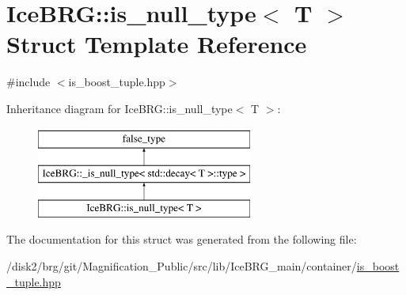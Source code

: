 \hypertarget{structIceBRG_1_1is__null__type}{}\section{Ice\+B\+R\+G\+:\+:is\+\_\+null\+\_\+type$<$ T $>$ Struct Template Reference}
\label{structIceBRG_1_1is__null__type}


{\ttfamily \#include $<$is\+\_\+boost\+\_\+tuple.\+hpp$>$}

Inheritance diagram for Ice\+B\+R\+G\+:\+:is\+\_\+null\+\_\+type$<$ T $>$\+:\begin{figure}[H]
\begin{center}
\leavevmode
\includegraphics[height=3.000000cm]{structIceBRG_1_1is__null__type}
\end{center}
\end{figure}


The documentation for this struct was generated from the following file\+:\begin{DoxyCompactItemize}
\item 
/disk2/brg/git/\+Magnification\+\_\+\+Public/src/lib/\+Ice\+B\+R\+G\+\_\+main/container/\hyperlink{is__boost__tuple_8hpp}{is\+\_\+boost\+\_\+tuple.\+hpp}\end{DoxyCompactItemize}
